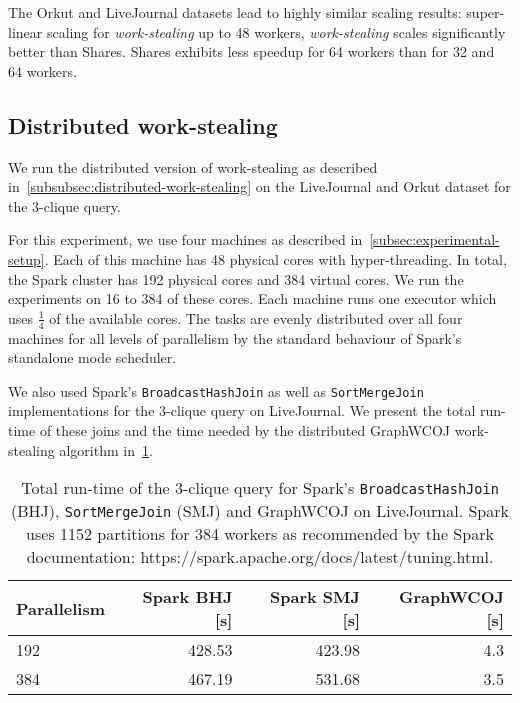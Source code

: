The Orkut and LiveJournal datasets lead to highly similar scaling results:
super-linear scaling for \textit{work-stealing} up to 48 workers,
\textit{work-stealing} scales significantly better than Shares.
Shares exhibits less speedup for 64 workers than for 32 and 64 workers.




\subsection{Distributed work-stealing}\label{subsec:distributed-work-stealing}

We run the distributed version of work-stealing as described in~\cref{subsubsec:distributed-work-stealing}
on the LiveJournal and Orkut dataset for the 3-clique query.

For this experiment, we use four machines as described in~\cref{subsec:experimental-setup}.
Each of this machine has 48 physical cores with hyper-threading.
In total, the Spark cluster has 192 physical cores and 384 virtual cores.
We run the experiments on 16 to 384 of these cores.
Each machine runs one executor which uses $\frac{1}{4}$ of the available cores.
The tasks are evenly distributed over all four machines for all levels of parallelism by
the standard behaviour of Spark's standalone mode scheduler.

We also used Spark's \texttt{BroadcastHashJoin} as well as \texttt{SortMergeJoin} implementations
for the 3-clique query on LiveJournal.
We present the total run-time of these joins and the time needed by the distributed GraphWCOJ work-stealing
algorithm in~\cref{table:spark-vs-distributed-work-stealing}.

\begin{table}
	\centering
    \begin{tabular}{lrrr}
        \toprule
        Parallelism & Spark BHJ [s] & Spark SMJ [s] & GraphWCOJ [s] \\ \midrule
        192         &  428.53       &  423.98       &  4.3          \\
        384         &  467.19       &  531.68       &  3.5          \\
        \bottomrule
    \end{tabular}
    \caption{
    	Total run-time of the 3-clique query for Spark's \texttt{BroadcastHashJoin} (BHJ),
    	\texttt{SortMergeJoin} (SMJ) and GraphWCOJ on LiveJournal.
    	    	Spark uses 1152 partitions for 384 workers as recommended by the Spark documentation: https://spark.apache.org/docs/latest/tuning.html.}
    \label{table:spark-vs-distributed-work-stealing}
\end{table}

